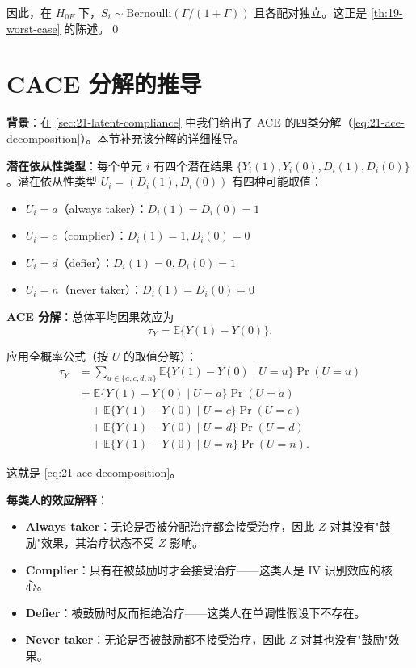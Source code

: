 因此，在 $H_{0F}$ 下，$S_i \sim \mathrm{Bernoulli}(\Gamma/(1+\Gamma))$ 且各配对独立。这正是 \cref{th:19-worst-case} 的陈述。\qed

\section{CACE 分解的推导}\label{sec:appendix-21-ace-decomposition}

\textbf{背景}：在 \cref{sec:21-latent-compliance} 中我们给出了 ACE 的四类分解（\cref{eq:21-ace-decomposition}）。本节补充该分解的详细推导。

\textbf{潜在依从性类型}：每个单元 $i$ 有四个潜在结果 $\{Y_i(1), Y_i(0), D_i(1), D_i(0)\}$。潜在依从性类型 $U_i = (D_i(1), D_i(0))$ 有四种可能取值：
\begin{itemize}
  \item $U_i = a$（always taker）：$D_i(1) = D_i(0) = 1$
  \item $U_i = c$（complier）：$D_i(1) = 1, D_i(0) = 0$
  \item $U_i = d$（defier）：$D_i(1) = 0, D_i(0) = 1$
  \item $U_i = n$（never taker）：$D_i(1) = D_i(0) = 0$
\end{itemize}

\textbf{ACE 分解}：总体平均因果效应为
\[
\tau_Y = \mathbb{E}\{Y(1) - Y(0)\}.
\]

应用全概率公式（按 $U$ 的取值分解）：
\[
\begin{aligned}
\tau_Y &= \sum_{u \in \{a,c,d,n\}} \mathbb{E}\{Y(1) - Y(0) \mid U = u\} \Pr(U = u) \\
&= \mathbb{E}\{Y(1) - Y(0) \mid U = a\} \Pr(U = a) \\
&\quad + \mathbb{E}\{Y(1) - Y(0) \mid U = c\} \Pr(U = c) \\
&\quad + \mathbb{E}\{Y(1) - Y(0) \mid U = d\} \Pr(U = d) \\
&\quad + \mathbb{E}\{Y(1) - Y(0) \mid U = n\} \Pr(U = n).
\end{aligned}
\]

这就是 \cref{eq:21-ace-decomposition}。

\textbf{每类人的效应解释}：
\begin{itemize}
  \item \textbf{Always taker}：无论是否被分配治疗都会接受治疗，因此 $Z$ 对其没有"鼓励"效果，其治疗状态不受 $Z$ 影响。
  \item \textbf{Complier}：只有在被鼓励时才会接受治疗——这类人是 IV 识别效应的核心。
  \item \textbf{Defier}：被鼓励时反而拒绝治疗——这类人在单调性假设下不存在。
  \item \textbf{Never taker}：无论是否被鼓励都不接受治疗，因此 $Z$ 对其也没有"鼓励"效果。
\end{itemize}


